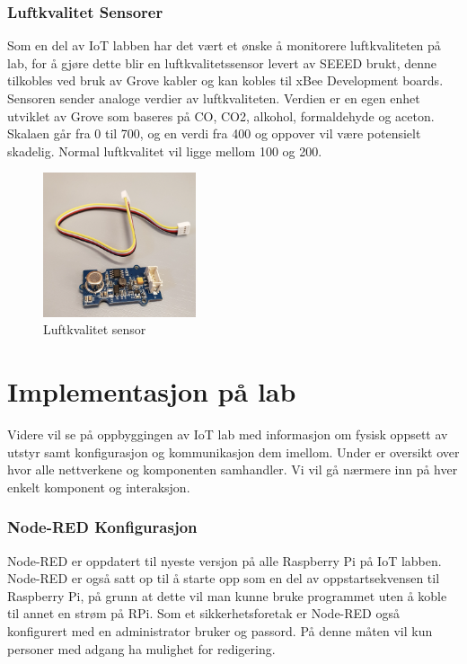 \documentclass{article}
\begin{document}
\subsubsection{Luftkvalitet Sensorer}
Som en del av IoT labben har det vært et ønske å monitorere luftkvaliteten på lab, for å gjøre dette blir en luftkvalitetssensor levert av SEEED brukt, denne tilkobles ved bruk av Grove kabler og kan kobles til xBee Development boards. Sensoren sender analoge verdier av luftkvaliteten. Verdien er en egen enhet utviklet av Grove som baseres på CO, CO2, alkohol, formaldehyde og aceton. Skalaen går fra 0 til 700, og en verdi fra 400 og oppover vil være potensielt skadelig. Normal luftkvalitet vil ligge mellom 100 og 200.

\begin{figure}[!ht]
  \centering
      \includegraphics[width=0.4\textwidth]{luftkvalitetsensor}
  \caption{Luftkvalitet sensor}
\end{figure}


\newpage
\section{Implementasjon på lab}
Videre vil se på oppbyggingen av IoT lab med informasjon om fysisk oppsett av utstyr samt konfigurasjon og kommunikasjon dem imellom. Under er oversikt over hvor alle nettverkene og komponenten samhandler. Vi vil gå nærmere inn på hver enkelt komponent og interaksjon. 



\subsubsection{Node-RED Konfigurasjon}
Node-RED er oppdatert til nyeste versjon på alle Raspberry Pi på IoT labben. Node-RED er også satt op til å starte opp som en del av oppstartsekvensen til Raspberry Pi, på grunn at dette vil man kunne bruke programmet uten å koble til annet en strøm på RPi. Som et sikkerhetsforetak er Node-RED også konfigurert med en administrator bruker og passord. På denne måten vil kun personer med adgang ha mulighet for redigering. 
\end{document}
